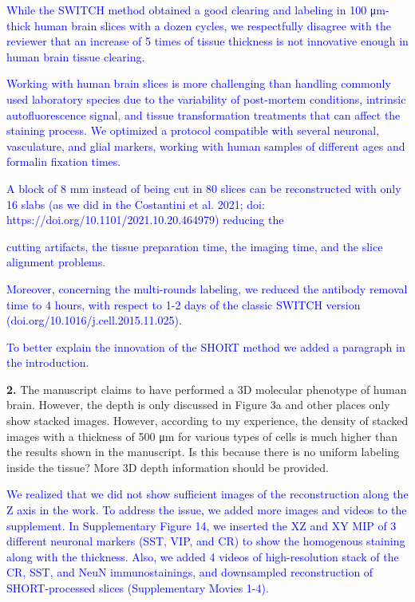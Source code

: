 \documentclass{article}
\newcommand{\reply}[1]{\textcolor{blue}{#1}}
\begin{document}
\noindent \reply{While the SWITCH method obtained a good clearing and labeling in 100 μm-thick human brain} \reply{slices with a dozen cycles, we respectfully disagree with the reviewer that an increase of 5 times of} \reply{tissue thickness is not innovative enough in human brain tissue clearing.}

\noindent \reply{Working with human brain slices is more challenging than handling commonly used laboratory} \reply{species due to the variability of post-mortem conditions, intrinsic autofluorescence signal, and} \reply{tissue transformation treatments that can affect the staining process. We optimized a protocol} \reply{compatible with several neuronal, vasculature, and glial markers, working with human samples of} \reply{different ages and formalin fixation times.}

\noindent \reply{A block of 8 mm instead of being cut in 80 slices can be reconstructed with only 16 slabs (as we} \reply{did in the Costantini et al. 2021; doi: https://doi.org/10.1101/2021.10.20.464979) reducing the}

\noindent {}\reply{cutting artifacts, the tissue preparation time, the imaging time, and the slice alignment problems.}

\noindent \reply{Moreover, concerning the multi-rounds labeling, we reduced the antibody removal time to 4 hours,} \reply{with respect to 1-2 days of the classic SWITCH version (doi.org/10.1016/j.cell.2015.11.025).}

\noindent \reply{To better explain the innovation of the SHORT method we added a paragraph in the introduction.}

\noindent \textbf{2.} The manuscript claims to have performed a 3D molecular phenotype of human brain. However, the depth is only discussed in Figure 3a and other places only show stacked images. However, according to my experience, the density of stacked images with a thickness of 500 μm for various types of cells is much higher than the results shown in the manuscript. Is this because there is no uniform labeling inside the tissue? More 3D depth information should be provided.

\noindent \reply{We realized that we did not show sufficient images of the reconstruction along the Z axis in the} \reply{work. To address the issue, we added more images and videos to the supplement. In} \reply{Supplementary Figure 14, we inserted the XZ and XY MIP of 3 different neuronal markers (SST,} \reply{VIP, and CR) to show the homogenous staining along with the thickness. Also, we added 4 videos} \reply{of high-resolution stack of the CR, SST, and NeuN immunostainings, and downsampled} \reply{reconstruction of SHORT-processed slices (Supplementary Movies 1-4).}
\end{document}
